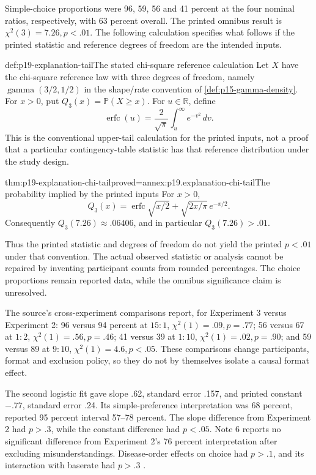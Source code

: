 Simple-choice proportions were 96, 59, 56 and 41 percent at
the four nominal ratios, respectively, with 63 percent overall.
The printed omnibus result is \(\chi^2(3)=7.26,p<.01\).
The following calculation specifies what follows if the printed
statistic and reference degrees of freedom are the intended inputs.

\begin{hbdefinition}{def:p19-explanation-tail}{The stated chi-square reference calculation}
Let \(X\) have the chi-square reference law with three degrees
of freedom, namely \(\operatorname{gamma}(3/2,1/2)\) in the
shape/rate convention of \cref{def:p15-gamma-density}.
For \(x>0\), put \(Q_3(x)=\mathbb P(X\geq x)\).
For \(u\in\mathbb R\), define
\[
 \operatorname{erfc}(u)=\frac2{\sqrt\pi}\int_u^\infty e^{-v^2}\,dv.
\]
This is the conventional upper-tail calculation for the printed
inputs, not a proof that a particular contingency-table statistic
has that reference distribution under the study design.
\end{hbdefinition}

\begin{hbtheorem}{thm:p19-explanation-chi-tail}{proved=annex:p19.explanation-chi-tail}{The probability implied by the printed inputs}
For \(x>0\),
\[
 Q_3(x)=\operatorname{erfc}\!\sqrt{x/2}
       +\sqrt{2x/\pi}\,e^{-x/2}.
\]
Consequently \(Q_3(7.26)\approx.06406\), and in particular
\(Q_3(7.26)>.01\).
\end{hbtheorem}

Thus the printed statistic and degrees of freedom do not yield
the printed \(p<.01\) under that convention. The actual observed
statistic or analysis cannot be repaired by inventing participant
counts from rounded percentages. The choice proportions remain
reported data, while the omnibus significance claim is unresolved.

The source's cross-experiment comparisons report, for Experiment 3
versus Experiment 2: 96 versus 94 percent at \(15:1\),
\(\chi^2(1)=.09,p=.77\); 56 versus 67 at \(1:2\),
\(\chi^2(1)=.56,p=.46\); 41 versus 39 at \(1:10\),
\(\chi^2(1)=.02,p=.90\); and 59 versus 89 at \(9:10\),
\(\chi^2(1)=4.6,p<.05\).
These comparisons change participants, format and exclusion policy,
so they do not by themselves isolate a causal format effect.

The second logistic fit gave slope .62, standard error .157,
and printed constant \(-.77\), standard error .24.
Its simple-preference interpretation was 68 percent, reported
95 percent interval 57--78 percent.
The slope difference from Experiment 2 had \(p>.3\), while
the constant difference had \(p<.05\).
Note 6 reports no significant difference from Experiment 2's
76 percent interpretation after excluding misunderstandings.
Disease-order effects on choice had \(p>.1\), and its interaction
with baserate had \(p>.3\)
\cite[pp.~246--247]{Lombrozo2007SimplicityProbability}.

